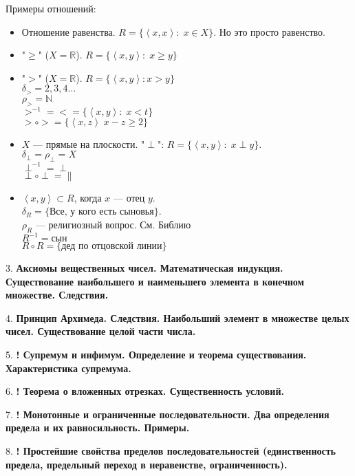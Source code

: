 \documentclass[12pt]{article}
\begin{document}
Примеры отношений:
\begin{itemize}
    \item Отношение равенства. $R = \{\left<x,x\right>: \; x \in X\}$. Но это просто равенство.
    \item "$\ge$" ($X = \mathbb{R}$). $R = \{ \left<x,y\right>: \; x \ge y\}$
    \item "$>$" ($X = \mathbb{R}$). $R = \{\left<x,y\right>: x > y\}$ \\
        $\delta_{>} = {2,3,4\ldots}$\\
        $\rho_> = \mathbb{N}$\\
        $>^{-1} = < = \{\left<x,y\right>: \; x < t\}$ \\
        $> \circ > = \{\left<x,z\right>\; x-z\ge2\}$
    \item $X$ --- прямые на плоскости. "$\perp$":  $R = \{\left<x,y\right>: \; x \perp y\}$. \\
            $\delta_\perp = \rho_\perp = X$ \\
            $\perp^{-1} = \perp$\\
            $\perp \circ \perp = \|$
    \item $\left<x, y\right> \subset R$, когда  $x$ --- отец  $y$. \\ 
        $\delta_R = \{\text{Все, у кого есть сыновья}\}$. \\
        $\rho_R$ --- религиозный вопрос. См. Библию \\
        $R^{-1} = \text{сын}$ \\
        $R \circ R = \{\text{дед по отцовской линии}\}$
\end{itemize}

3. \textbf{Аксиомы вещественных чисел. Математическая индукция. Существование наибольшего и наименьшего элемента в конечном множестве. Следствия.}

4. \textbf{Принцип Архимеда. Следствия. Наибольший элемент в множестве целых чисел. Существование целой части числа.}

5. \textbf{! Супремум и инфимум. Определение и теорема существования. Характеристика супремума.}

6. \textbf{! Теорема о вложенных отрезках. Существенность условий.}

7. \textbf{! Монотонные и ограниченные последовательности. Два определения предела и их равносильность. Примеры.}

8. \textbf{! Простейшие свойства пределов последовательностей (единственность предела, предельный переход в неравенстве, ограниченность).}
\end{document}
